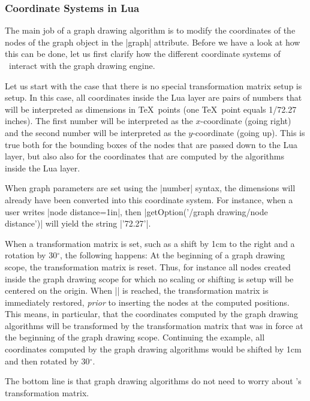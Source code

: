 \subsubsection{Coordinate Systems in Lua}

\label{section-gd-lua-coordinates}

The main job of a graph drawing algorithm is to modify the
coordinates of the nodes of the graph object in the |graph|
attribute. Before we have a look at how this can be done, let us 
first clarify how the different coordinate systems of \pgfname\
interact with the graph drawing engine.

Let us start with the case that there is no special transformation
matrix setup is setup. In this case, all coordinates inside the Lua
layer are pairs of numbers that will be interpreted as dimensions in
\TeX\ points (one \TeX\ point equals 1/72.27 inches). The first number
will be interpreted as the $x$-coordinate (going right) and the second
number will be interpreted as the $y$-coordinate (going up). This is
true both for the bounding boxes of the nodes that are passed down to
the Lua layer, but also also for the coordinates that are computed by
the algorithms inside the Lua layer.

When graph parameters are set using the |number|
syntax, the dimensions will already have been converted into this
coordinate system. For instance, when a user writes
|node distance=1in|, then |getOption('/graph drawing/node distance')|
will yield the string |'72.27'|.

When a transformation matrix is
set, such as a shift by 1cm to the right and a rotation by
30$^\circ$, the following happens: At the beginning of a
graph drawing scope, the transformation matrix is reset. Thus, for
instance all nodes created inside the graph drawing scope for which no
scaling or shifting is setup will be centered on the origin. When
|\pgfgdendscope| is reached, the transformation matrix is immediately
restored, \emph{prior} to inserting the nodes at the computed
positions. This means, in particular, that the coordinates computed by
the graph drawing algorithms will be transformed by the transformation
matrix that was in force at the beginning of the graph drawing
scope. Continuing the example, all coordinates computed by the graph
drawing algorithms would be shifted by 1cm and then rotated by
30$^\circ$.

The bottom line is that graph drawing algorithms do not need to worry
about \pgfname's transformation matrix.



